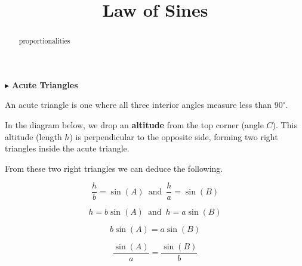 \documentclass{ximera}
\title{Law of Sines}
\begin{document}
\begin{abstract}
proportionalities
\end{abstract}
\maketitle











$\blacktriangleright$  \textbf{\textcolor{blue!55!black}{Acute Triangles}}  

An acute triangle is one where all three interior angles measure less than $90^{\circ}$. 

In the diagram below, we drop an \textbf{altitude} from the top corner (angle $C$). This altitude (length $h$) is perpendicular to the opposite side, forming two right triangles inside the acute triangle.


\begin{image}[3in]
  \end{image}

From these two right triangles we can deduce the following. 

\[    \frac{h}{b} = \sin(A)   \, \text{ and } \,    \frac{h}{a} = \sin(B)       \]



\[    h = b \sin(A)      \, \text{ and } \,    h = a \sin(B)    \]

\[     b \sin(A)  = a \sin(B)    \]


\[    \frac{\sin(A)}{a} = \frac{\sin(B)}{b}      \]
\end{document}
